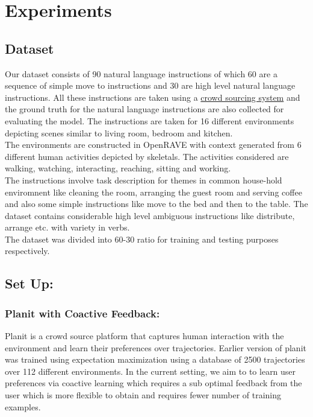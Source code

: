 \section{Experiments}
\subsection{Dataset}
Our dataset consists of 90 natural language instructions of which 60 are a sequence of simple move to instructions and 30 are high level natural language instructions. All these instructions are taken using a \href{http://52.25.65.189:9000/#/getFeedback}{crowd sourcing system} and the ground truth for the natural language instructions are also collected for evaluating the model. The instructions are taken for 16 different environments depicting scenes similar to living room, bedroom and kitchen. \\
The environments are constructed in OpenRAVE with context generated from 6 different human activities depicted by skeletals. The activities considered are walking, watching, interacting, reaching, sitting and working. \\
The instructions involve task description for themes in common house-hold enviromnent like cleaning the room, arranging the guest room and serving coffee and also some simple instructions like move to the bed and then to the table. The dataset contains considerable high level ambiguous instructions like distribute, arrange etc. with variety in verbs.\\
The dataset was divided into 60-30 ratio for training and testing purposes respectively.  


\subsection{Set Up:}
	\subsubsection{Planit with Coactive Feedback:} 
		Planit is a crowd source platform that captures human interaction with the environment and learn their preferences over trajectories. Earlier version of planit was trained using expectation maximization using a database of 2500 trajectories over 112 different environments. In the current setting, we aim to to learn user preferences via coactive learning which requires a sub optimal feedback from the user which is more flexible to obtain and requires fewer number of training examples.


